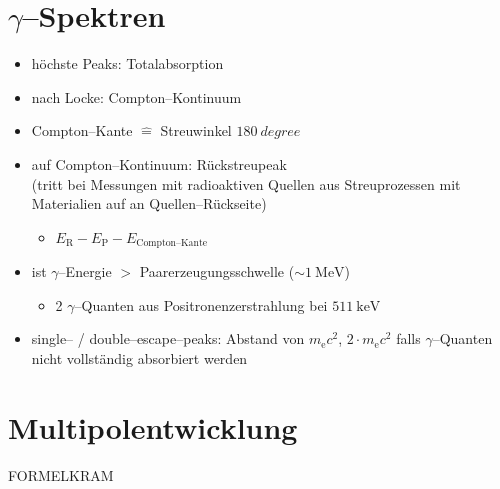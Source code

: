 \documentclass[BCOR=5mm,DIV=calc,listof=totoc,headings=big]{scrartcl}
\begin{document}
\section{$\gamma$--Spektren}
\label{sec:gamma-spektren}
\begin{itemize}
\item höchste Peaks: Totalabsorption
\item nach Locke: Compton--Kontinuum
\item Compton--Kante $\hat{=}$ Streuwinkel $\SI{180}{degree}$
\item auf Compton--Kontinuum: Rückstreupeak\\
  (tritt bei Messungen mit radioaktiven Quellen aus Streuprozessen mit
  Materialien auf an Quellen--Rückseite)
  \begin{itemize}
  \item $E_{\mathrm{R}}-E_{\mathrm{P}}-E_{\text{Compton--Kante}}$
  \end{itemize}
\item ist $\gamma$--Energie $>$ Paarerzeugungsschwelle ($\sim \SI{1}{\MeV}$)
  \begin{itemize}
  \item 2 $\gamma$--Quanten aus Positronenzerstrahlung bei $\SI{511}{\keV}$
  \end{itemize}
\item single-- / double--escape--peaks: Abstand von
  $m_{\mathrm{e}}c^{2}$, $2 \cdot m_{\mathrm{e}}c^{2}$ falls
  $\gamma$--Quanten nicht vollständig absorbiert werden
\end{itemize}

\section{Multipolentwicklung}
\label{sec:multipolentwicklung}
FORMELKRAM 
\end{document}
